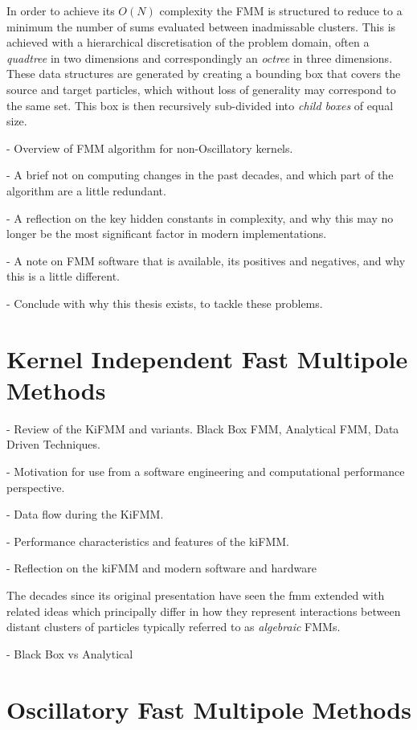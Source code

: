 In order to achieve its $O(N)$ complexity the FMM is structured to reduce to a minimum the number of sums evaluated between inadmissable clusters. This is achieved with a hierarchical discretisation of the problem domain, often a \textit{quadtree} in two dimensions and correspondingly an \textit{octree} in three dimensions. These data structures are generated by creating a bounding box that covers the source and target particles, which without loss of generality may correspond to the same set. This box is then recursively sub-divided into \textit{child boxes} of equal size.

- Overview of FMM algorithm for non-Oscillatory kernels.

- A brief not on computing changes in the past decades, and which part of the algorithm are a little redundant.

- A reflection on the key hidden constants in complexity, and why this may no longer be the most significant factor in modern implementations.

- A note on FMM software that is available, its positives and negatives, and why this is a little different.

- Conclude with why this thesis exists, to tackle these problems.


\section{Kernel Independent Fast Multipole Methods}\label{chpt:fmm:sec:kifmm}

- Review of the KiFMM and variants. Black Box FMM, Analytical FMM, Data Driven Techniques.

- Motivation for use from a software engineering and computational performance perspective.

- Data flow during the KiFMM.

- Performance characteristics and features of the kiFMM.

- Reflection on the kiFMM and modern software and hardware

The decades since its original presentation have seen the \acrshort{fmm} extended with related ideas which principally differ in how they represent interactions between distant clusters of particles typically referred to as \textit{algebraic} FMMs.


- Black Box vs Analytical

\section{Oscillatory Fast Multipole Methods}

